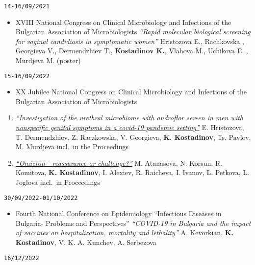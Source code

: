 \documentclass[
  12pt,
  letterpaper,
  DIV=11,
  numbers=noendperiod]{scrartcl}
\providecommand{\tightlist}{%
  \setlength{\itemsep}{0pt}\setlength{\parskip}{0pt}}\usepackage{longtable,booktabs,array}
\begin{document}
\texttt{14-16/09/2021}

\begin{itemize}
\tightlist
\item
  XVIII National Congress on Clinical Microbiology and Infections of the
  Bulgarian Association of Microbiologists \textbar{} \emph{``Rapid
  molecular biological screening for vaginal candidiasis in symptomatic
  women''} \textbar{} Hristozova E., Rachkovska , Georgieva V.,
  Dermendzhiev T., \textbf{Kostadinov K.}, Vlahova M., Uchikova E. ,
  Murdjeva M. (poster)
\end{itemize}

\texttt{15-16/09/2022}

\begin{itemize}
\tightlist
\item
  XX Jubilee National Congress on Clinical Microbiology and Infections
  of the Bulgarian Association of Microbiologists
\end{itemize}

\begin{enumerate}
\def\labelenumi{\arabic{enumi}.}
\item
  \emph{\href{https://www.bam-bg.net/images/documents/3Posters.pdf}{``Investigation
  of the urethral microbiome with androflor screen in men with
  nonspecific genital symptoms in a covid-19 pandemic setting''}}
  \textbar{} E. Hristozova, T. Dermendzhiev, Z. Raczkowska, V.
  Georgieva, \textbf{K. Kostadinov}, Ts. Pavlov, M. Murdjeva \textbar{}
  incl.~in the Proceedings
\item
  \emph{\href{https://www.bam-bg.net/images/documents/2Abstracts.pdf}{``Omicron
  - reassurance or challenge?''}} \textbar{} M. Atanasova, N. Korsun, R.
  Komitova, \textbf{K. Kostadinov}, I. Alexiev, R. Raicheva, I. Ivanov,
  L. Petkova, L. Joglova \textbar{} incl.~in Proceedings
\end{enumerate}

\texttt{30/09/2022-01/10/2022}

\begin{itemize}
\tightlist
\item
  Fourth National Conference on Epidemiology \textbar{} ``Infectious
  Diseases in Bulgaria- Problems and Perspectives'' \textbar{}
  \emph{``COVID-19 in Bulgaria and the impact of vaccines on
  hospitalization, mortality and lethality''} \textbar{} A. Kevorkian,
  \textbf{K. Kostadinov}, V. K. A. Kunchev, A. Serbezova
\end{itemize}

\texttt{16/12/2022}
\end{document}
